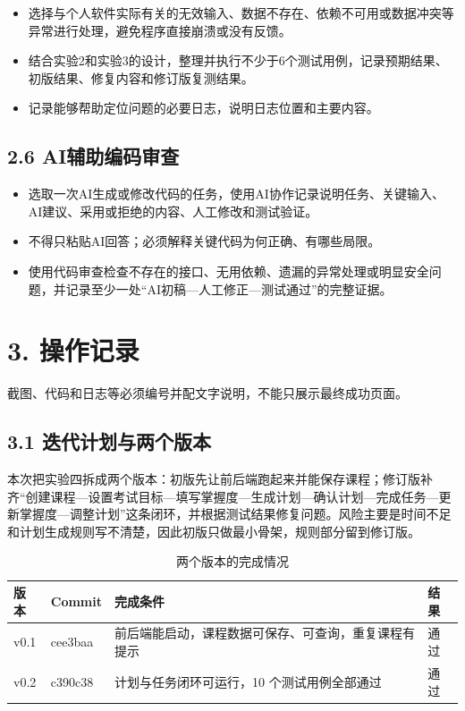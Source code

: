 \documentclass[UTF8,12pt,a4paper]{ctexart}
\begin{document}
\begin{itemize}
  \item 选择与个人软件实际有关的无效输入、数据不存在、依赖不可用或数据冲突等异常进行处理，避免程序直接崩溃或没有反馈。
  \item 结合实验2和实验3的设计，整理并执行不少于6个测试用例，记录预期结果、初版结果、修复内容和修订版复测结果。
  \item 记录能够帮助定位问题的必要日志，说明日志位置和主要内容。
\end{itemize}

\subsection*{2.6 AI辅助编码审查}

\begin{itemize}
  \item 选取一次AI生成或修改代码的任务，使用AI协作记录说明任务、关键输入、AI建议、采用或拒绝的内容、人工修改和测试验证。
  \item 不得只粘贴AI回答；必须解释关键代码为何正确、有哪些局限。
  \item 使用代码审查检查不存在的接口、无用依赖、遗漏的异常处理或明显安全问题，并记录至少一处“AI初稿—人工修正—测试通过”的完整证据。
\end{itemize}

\section*{3. 操作记录}

截图、代码和日志等必须编号并配文字说明，不能只展示最终成功页面。

\subsection*{3.1 迭代计划与两个版本}

本次把实验四拆成两个版本：初版先让前后端跑起来并能保存课程；修订版补齐“创建课程—设置考试目标—填写掌握度—生成计划—确认计划—完成任务—更新掌握度—调整计划”这条闭环，并根据测试结果修复问题。风险主要是时间不足和计划生成规则写不清楚，因此初版只做最小骨架，规则部分留到修订版。

\begin{table}[H]
\centering
\caption{两个版本的完成情况}
\small
\begin{tabularx}{\textwidth}{p{1.3cm}p{2.0cm}X p{1.6cm}}
\toprule
版本 & Commit & 完成条件 & 结果 \\
\midrule
v0.1 & cee3baa & 前后端能启动，课程数据可保存、可查询，重复课程有提示 & 通过 \\
v0.2 & c390c38 & 计划与任务闭环可运行，10 个测试用例全部通过 & 通过 \\
\bottomrule
\end{tabularx}
\end{table}
\end{document}

